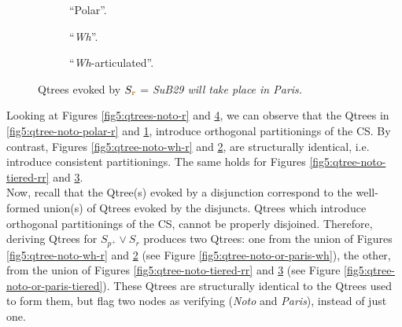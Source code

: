 \begin{figure}[H]
	\centering
	\begin{subfigure}[b]{.2\linewidth}
		\centering
		\caption[]{``Polar''.}\label{fig5:qtree-paris-polar}
	\end{subfigure}\hfill
	\begin{subfigure}[b]{.37\linewidth}
		\centering
		\caption[]{``\textit{Wh}''.}\label{fig5:qtree-paris-wh}
	\end{subfigure}\hfill
	\begin{subfigure}[b]{.37\linewidth}
		\centering
		\caption[]{``\textit{Wh}-articulated''.}\label{fig5:qtree-paris-tiered}
	\end{subfigure}
	\caption[]{Qtrees evoked by $S_{\textbf{\textcolor{brown}{r}}}$ = \textit{SuB29 will take place in Paris.}}\label{fig5:qtrees-paris}
\end{figure}

Looking at Figures \ref{fig5:qtrees-noto-r} and \ref{fig5:qtrees-paris}, we can observe that the Qtrees in \ref{fig5:qtree-noto-polar-r} and \ref{fig5:qtree-paris-polar}, introduce orthogonal partitionings of the CS. By contrast, Figures \ref{fig5:qtree-noto-wh-r} and \ref{fig5:qtree-paris-wh}, are structurally identical, i.e. introduce consistent partitionings. The same holds for Figures \ref{fig5:qtree-noto-tiered-rr} and \ref{fig5:qtree-paris-tiered}.\\

Now, recall that the Qtree(s) evoked by a disjunction correspond to the well-formed union(s) of Qtrees evoked by the disjuncts. Qtrees which introduce orthogonal partitionings of the CS, cannot be properly disjoined. Therefore, deriving Qtrees for $S_{p^+} \vee S_r$ produces two Qtrees: one from the union of Figures \ref{fig5:qtree-noto-wh-r} and \ref{fig5:qtree-paris-wh} (see Figure \ref{fig5:qtree-noto-or-paris-wh}), the other, from the union of Figures \ref{fig5:qtree-noto-tiered-rr} and \ref{fig5:qtree-paris-tiered} (see Figure \ref{fig5:qtree-noto-or-paris-tiered}). These Qtrees are structurally identical to the Qtrees used to form them, but flag two nodes as verifying (\textit{Noto} and \textit{Paris}), instead of just one.


